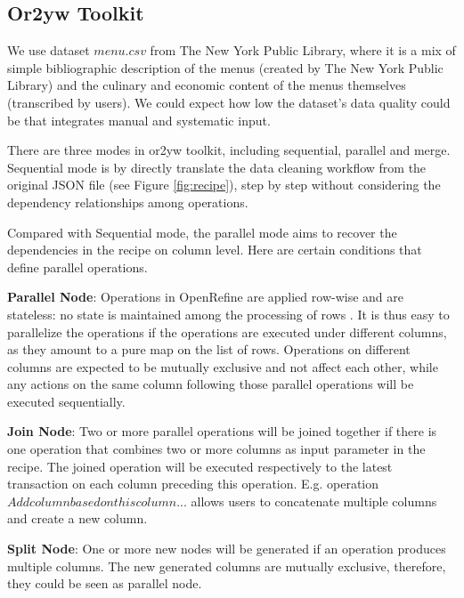 \subsection{Or2yw Toolkit}
We use dataset $menu.csv$ from The New York Public Library, where it is a mix of simple bibliographic description of the menus (created by The New York Public Library) and the culinary and economic content of the menus themselves (transcribed by users)\cite{whatsonmenu}. We could expect how low the dataset's data quality could be that integrates manual and systematic input.

There are three modes in or2yw toolkit, including sequential, parallel and merge. Sequential mode is by directly translate the data cleaning workflow from the original JSON file (see Figure \ref{fig:recipe}), step by step without considering the dependency relationships among operations. 

Compared with Sequential mode, the parallel mode aims to recover the dependencies in the recipe on column level. Here are certain conditions that define parallel operations. 

\textbf{Parallel Node}: Operations in OpenRefine are applied row-wise and are stateless: no state is maintained among the processing of rows \cite{delpeuch2019complete}. It is thus easy to parallelize the operations if the operations are executed under different columns, as they amount to a pure map on the list of rows. Operations on different columns are expected to be mutually exclusive and not affect each other, while any actions on the same column following those parallel operations will be executed sequentially. 

\textbf{Join Node}: Two or more parallel operations will be joined together if there is one operation that combines two or more columns as input parameter in the recipe. The joined operation will be executed respectively to the latest transaction on each column preceding this operation. E.g. operation $Add column based on this column...$ allows users to concatenate multiple columns and create a new column. 

\textbf{Split Node}: One or more new nodes will be generated if an operation produces multiple columns. The new generated columns are mutually exclusive, therefore, they could be seen as parallel node.  


